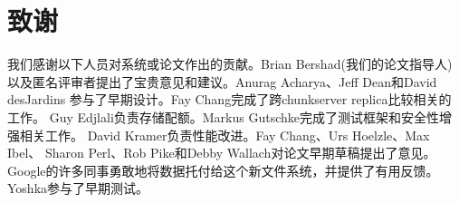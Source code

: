 \section*{致谢}
\noindent
我们感谢以下人员对系统或论文作出的贡献。Brian Bershad(我们的论文指导人)
以及匿名评审者提出了宝贵意见和建议。Anurag Acharya、Jeff Dean和David desJardins
参与了早期设计。Fay Chang完成了跨chunkserver replica比较相关的工作。
Guy Edjlali负责存储配额。Markus Gutschke完成了测试框架和安全性增强相关工作。
David Kramer负责性能改进。Fay Chang、Urs Hoelzle、Max Ibel、
Sharon Perl、Rob Pike和Debby Wallach对论文早期草稿提出了意见。
Google的许多同事勇敢地将数据托付给这个新文件系统，并提供了有用反馈。Yoshka参与了早期测试。
